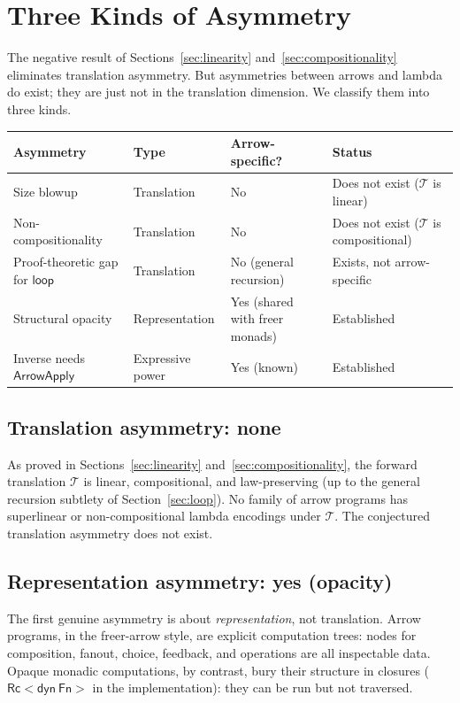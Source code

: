 \documentclass[11pt,a4paper]{article}
\theoremstyle{definition}
\theoremstyle{remark}
\newcommand{\loopop}{\mathsf{loop}}
\newcommand{\ArrowApply}{\mathsf{ArrowApply}}
\newcommand{\T}{\mathcal{T}}
\begin{document}
\section{Three Kinds of Asymmetry}\label{sec:three-asymmetries}

The negative result of Sections~\ref{sec:linearity} and~\ref{sec:compositionality} eliminates
translation asymmetry. But asymmetries between arrows and lambda do exist;
they are just not in the translation dimension. We classify them into three
kinds.

\begin{center}
\begin{tabular}{llll}
\toprule
Asymmetry & Type & Arrow-specific? & Status \\
\midrule
Size blowup & Translation & No & Does not exist ($\T$ is linear) \\
Non-compositionality & Translation & No & Does not exist ($\T$ is compositional) \\
Proof-theoretic gap for $\loopop$ & Translation & No (general recursion) & Exists, not arrow-specific \\
Structural opacity & Representation & Yes (shared with freer monads) & Established \\
Inverse needs $\ArrowApply$ & Expressive power & Yes (known) & Established \\
\bottomrule
\end{tabular}
\end{center}

\subsection{Translation asymmetry: none}

As proved in Sections~\ref{sec:linearity} and~\ref{sec:compositionality}, the forward
translation $\T$ is linear, compositional, and law-preserving (up to the
general recursion subtlety of Section~\ref{sec:loop}). No family of arrow programs
has superlinear or non-compositional lambda encodings under $\T$. The
conjectured translation asymmetry does not exist.

\subsection{Representation asymmetry: yes (opacity)}

The first genuine asymmetry is about \emph{representation}, not
translation. Arrow programs, in the freer-arrow style, are explicit
computation trees: nodes for composition, fanout, choice, feedback, and
operations are all inspectable data. Opaque monadic computations, by
contrast, bury their structure in closures ($\mathsf{Rc<dyn\ Fn>}$ in the
implementation): they can be run but not traversed.
\end{document}
